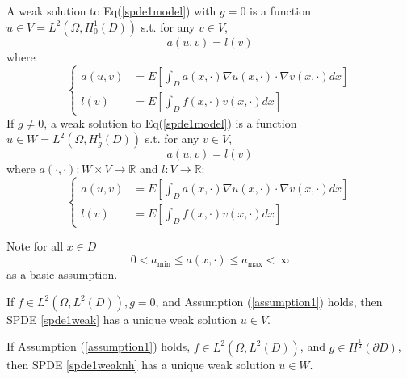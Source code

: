 \begin{definition}
    A weak solution to Eq(\ref{spde1model}) with $g=0$ is a function $u\in V=L^2(\Omega, H_0^1(D))$ s.t. for any $v\in V$,
    \begin{equation}
        a(u, v) = l(v)\label{spde1weak}
    \end{equation}
    where\begin{equation}\left\{
        \begin{aligned}
            a(u, v) &= E\left[\int_D a(x, \cdot)\nabla u(x, \cdot)\cdot \nabla v(x, \cdot)dx\right]\\
            l(v) &= E\left[\int_D f(x, \cdot)v(x, \cdot)dx\right]
        \end{aligned}\right.
    \end{equation}
    If $g\neq 0$, a weak solution to Eq(\ref{spde1model}) is a function $u\in W=L^2(\Omega, H_g^1(D))$ s.t. for any $v\in V$,
    \begin{equation}
        a(u, v) = l(v)\label{spde1weaknh}
    \end{equation}
    where $a(\cdot, \cdot):W\times V\to \mathbb{R}$ and $l:V\to \mathbb{R}$:
    \begin{equation}\left\{
        \begin{aligned}
            a(u, v) &= E\left[\int_D a(x, \cdot)\nabla u(x, \cdot)\cdot \nabla v(x, \cdot)dx\right]\\
            l(v) &= E\left[\int_D f(x, \cdot)v(x, \cdot)dx\right]
        \end{aligned}\right.
    \end{equation}
\end{definition}

\begin{theorem}
    Note for all $x\in D$
    \begin{equation}\label{assumption1}
        0<a_{\min}\leq a(x, \cdot)\leq a_{\max}<\infty
    \end{equation} as a basic assumption.

    If $f\in L^2(\Omega, L^2(D)),g=0$, and Assumption (\ref{assumption1}) holds, then SPDE \ref{spde1weak} has a unique weak solution $u\in V$.

    If Assumption (\ref{assumption1}) holds, $f\in L^2(\Omega, L^2(D))$, and $g\in H^{\frac{1}{2}}(\partial D)$, 
    then SPDE \ref{spde1weaknh} has a unique weak solution $u\in W$.
\end{theorem}

